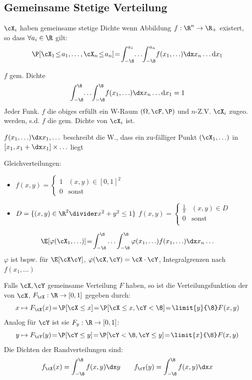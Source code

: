 \subsection{Gemeinsame Stetige Verteilung}
\shortdefinition $\cX_i$ haben gemeinsame stetige Dichte wenn Abbildung $f : \R^n \rightarrow \R_+$ existert, so dass $\forall a_i \in \R$ gilt:
\[
    \P[\cX_1 \! \leq \! a_1, \ldots, \cX_n \! \leq \! a_n]\! = \! \int_{-\8}^{a_1}\! \ldots \! \int_{-\8}^{a_n} \! f(x_1, \ldots) \dx x_n \ldots \mbox{d} x_1
\]

\shorttheorem $f$ gem. Dichte
\[
    \int_{-\8}^{\8}\! \ldots \! \int_{-\8}^{\8} \! f(x_1, \ldots) \dx x_n \ldots \mbox{d} x_1 = 1
\]
Jeder Funk. $f$ die obiges erfüllt ein W-Raum $(\Omega, \cF, \P)$ und $n$-Z.V. $\cX_i$ zugeo. werden, s.d. $f$ die gem. Dichte von $\cX_i$ ist.

\inlineintuition $f(x_1, \ldots) \dx x_1, \ldots$ beschreibt die W., dass ein zu-fälliger Punkt $(\cX_1, \ldots)$ in $[x_1, x_1 + \dx x_1] \times \ldots$ liegt

\shortexample Gleichverteilungen:
\begin{itemize}
    \item {} $f(x, y) = \begin{cases}
                  1 & (x, y) \in [0, 1]^2 \\
                  0 & \text{sonst}
              \end{cases}$
    \item {} $D = \{ (x, y) \in \R^2 \divider x^2 + y^2 \leq 1 \}$
          $f(x, y) = \begin{cases}
                  \frac{1}{\pi} & (x, y) \in D \\
                  0             & \text{sonst} \\
              \end{cases}$
\end{itemize}

\[
    \E[\varphi(\cX_1, \ldots)] \! = \! \int_{-\8}^{\8} \ldots \int_{-\8}^{\8} \varphi(x_1, \ldots) f(x_1, \ldots) \dx x_n \ldots
\]
{\scriptsize $\varphi$ ist bspw. für $\E[\cX\cY]$, $\varphi(\cX, \cY) = \cX \cdot \cY$, Integralgrenzen nach $f(x_1, \ldots)$}

\shortdefinition[Randverteilung] Falls $\cX, \cY$ gemeinsame Verteilung $F$ haben, so ist die Verteilungsfunktion der  von $\cX$,
$F_\cX : \R \rightarrow [0, 1]$ gegeben durch:
\[
    x \mapsto F_\cX(x) \! = \! \P[\cX \leq x] \! = \! \P[\cX \leq x, \cY < \8] \! = \! \limit{y}{\8} F(x, y)
\]
Analog für $\cY$ ist sie $F_y : \R \rightarrow [0, 1]$:
\[
    y \mapsto F_\cY(y) \! = \! \P[\cY \leq y] \! = \! \P[\cY < \8, \cY \leq y] \! = \! \limit{x}{\8} F(x, y)
\]
Die Dichten der Randverteilungen sind:
\[
    f_\cX(x) = \int_{-\8}^{\8} f(x, y) \dx y
    \qquad
    f_\cY(y) = \int_{-\8}^{\8} f(x, y) \dx x
\]

